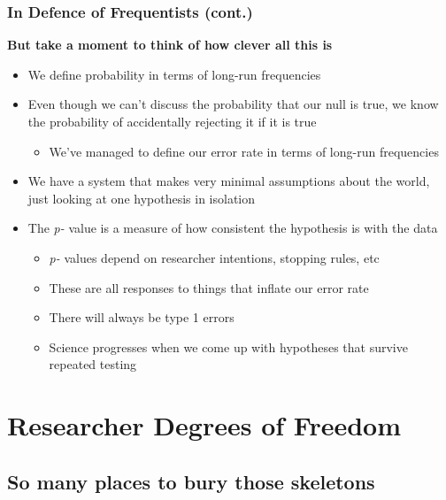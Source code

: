 \documentclass[10pt, block=fill]{beamer}
\begin{document}
\begin{frame}
    \frametitle{In Defence of Frequentists (cont.)}
    
    \textbf{But take a moment to think of how clever all this is}
    
    \begin{itemize}
        \item We define probability in terms of long-run frequencies
        \item Even though we can't discuss the probability that our null is true, we know the probability of accidentally rejecting it if it is true
        \begin{itemize}
            \item We've managed to define our error rate in terms of long-run frequencies
        \end{itemize}
        \item We have a system that makes very minimal assumptions about the world, just looking at one hypothesis in isolation
        \item The \textit{p-} value is a measure of how consistent the hypothesis is with the data
        \begin{itemize}
            \item \textit{p-} values depend on researcher intentions, stopping rules, etc
            \item These are all responses to things that inflate our error rate
            \item There will always be type 1 errors
            \item Science progresses when we come up with hypotheses that survive repeated testing
        \end{itemize}
    \end{itemize}
    
\end{frame}


\section{Researcher Degrees of Freedom}
\subsection{So many places to bury those skeletons}
\end{document}
